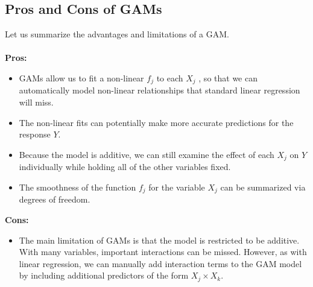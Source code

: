 \subsection{Pros and Cons of GAMs}
Let us summarize the advantages and limitations of a GAM.\\\\
\textbf{Pros:}
\begin{itemize}
    \item GAMs allow us to fit a non-linear $f_j$ to each $X_j$ , so that we can automatically model non-linear relationships that standard linear regression will miss.

    \item The non-linear fits can potentially make more accurate predictions for the response $Y$.

    
    \item Because the model is additive, we can still examine the effect of each $X_j$ on $Y$ individually while holding all of the other variables fixed.

    \item The smoothness of the function $f_j$ for the variable $X_j$ can be summarized via degrees of freedom.
\end{itemize}
\textbf{Cons:}
\begin{itemize}
    \item The main limitation of GAMs is that the model is restricted to be additive. With many variables, important interactions can be missed. However, as with linear regression, we can manually add interaction terms to the GAM model by including additional predictors of the form $X_j \times X_k$.
\end{itemize}

